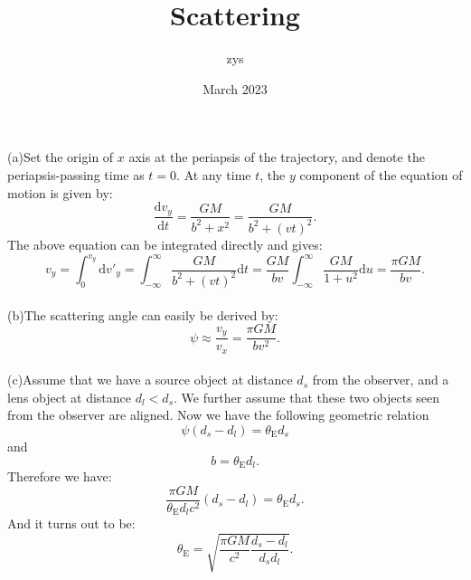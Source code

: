 \documentclass{article}
\title{Scattering}
\author{zys}
\date{March 2023}
\begin{document}
\maketitle

\noindent(a)Set the origin of $x$ axis at the periapsis of the trajectory, and denote the periapsis-passing time as $t=0$. At any time $t$, the $y$ component of the equation of motion is given by:
\begin{equation}
    \frac{\mathrm{d}v_y}{\mathrm{d}t}=\frac{GM}{b^2+x^2}=\frac{GM}{b^2+(vt)^2}.
\end{equation}
The above equation can be integrated directly and gives:
\begin{equation}
        v_y=\int_0^{v_y}\mathrm{d}v'_y=\int_{-\infty}^\infty\frac{GM}{b^2+(vt)^2}\mathrm{d}t=\frac{GM}{bv}\int_{-\infty}^\infty\frac{GM}{1+u^2}\mathrm{d}u=\frac{\pi GM}{bv}.
\end{equation}\\
(b)The scattering angle can easily be derived by:
\begin{equation}
    \psi\approx\frac{v_y}{v_x}=\frac{\pi GM}{bv^2}.
\end{equation}\\
(c)Assume that we have a source object at distance $d_s$ from the observer, and a lens object at distance $d_l<d_s$. We further assume that these two objects seen from the observer are aligned. Now we have the following geometric relation
\begin{equation}
    \psi(d_s-d_l)=\theta_\mathrm{E}d_s
\end{equation}
and
\begin{equation}
    b=\theta_\mathrm{E}d_l.
\end{equation}
Therefore we have:
\begin{equation}
    \frac{\pi GM}{\theta_\mathrm{E}d_l c^2}(d_s-d_l)=\theta_\mathrm{E}d_s.
\end{equation}
And it turns out to be:
\begin{equation}
    \theta_\mathrm{E}=\sqrt{\frac{\pi GM}{c^2}\frac{d_s-d_l}{d_s d_l}}.
\end{equation}
\end{document}
